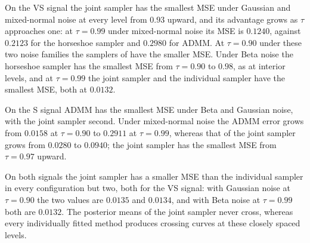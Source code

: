 On the VS signal the joint sampler has the smallest MSE under Gaussian and mixed-normal noise at every level from $0.93$ upward, and its advantage grows as $\tau$ approaches one: at $\tau=0.99$ under mixed-normal noise its MSE is $0.1240$, against $0.2123$ for the horseshoe sampler and $0.2980$ for ADMM. At $\tau=0.90$ under these two noise families the samplers of \citet{onizuka2024fast} have the smaller MSE. Under Beta noise the horseshoe sampler has the smallest MSE from $\tau=0.90$ to $0.98$, as at interior levels, and at $\tau=0.99$ the joint sampler and the individual sampler have the smallest MSE, both at $0.0132$.

On the S signal ADMM has the smallest MSE under Beta and Gaussian noise, with the joint sampler second. Under mixed-normal noise the ADMM error grows from $0.0158$ at $\tau=0.90$ to $0.2911$ at $\tau=0.99$, whereas that of the joint sampler grows from $0.0280$ to $0.0940$; the joint sampler has the smallest MSE from $\tau=0.97$ upward.

On both signals the joint sampler has a smaller MSE than the individual sampler in every configuration but two, both for the VS signal: with Gaussian noise at $\tau=0.90$ the two values are $0.0135$ and $0.0134$, and with Beta noise at $\tau=0.99$ both are $0.0132$. The posterior means of the joint sampler never cross, whereas every individually fitted method produces crossing curves at these closely spaced levels.

